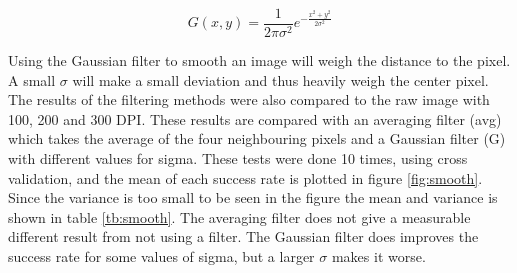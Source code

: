 \begin{equation}
G(x,y) = \frac{1}{2\pi \sigma^2} e^{- \frac{x^2+y^2}{2\sigma^2}} \label{eq:gauss}
\end{equation}

Using the Gaussian filter to smooth an image will weigh the distance to the pixel.
A small $\sigma$ will make a small deviation and thus heavily weigh the center pixel.
The results of the filtering methods were also compared to the raw image with 100, 200 and 300 DPI.
These results are compared with an averaging filter (avg) which takes the average of the four neighbouring pixels and a Gaussian filter (G) with different values for sigma.
These tests were done 10 times, using cross validation, and the mean of each success rate is plotted in figure \ref{fig:smooth}. 
Since the variance is too small to be seen in the figure the mean and variance is shown in table \ref{tb:smooth}.
The averaging filter does not give a measurable different result from not using a filter.
The Gaussian filter does improves the success rate for some values of sigma, but a larger $\sigma$ makes it worse.

